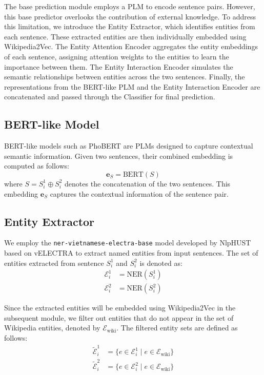 \documentclass{llncs}
\begin{document}
The base prediction module employs a PLM to encode sentence pairs. However, this base predictor overlooks the contribution of external knowledge. To address this limitation, we introduce the Entity Extractor, which identifies entities from each sentence. These extracted entities are then individually embedded using Wikipedia2Vec. The Entity Attention Encoder aggregates the entity embeddings of each sentence, assigning attention weights to the entities to learn the importance between them. The Entity Interaction Encoder simulates the semantic relationships between entities across the two sentences. Finally, the representations from the BERT-like PLM and the Entity Interaction Encoder are concatenated and passed through the Classifier for final prediction.

\subsection{BERT-like Model}

BERT-like models such as PhoBERT \parencite{nguyen2020phobert} are PLMs designed to capture contextual semantic information. Given two sentences, their combined embedding is computed as follows:
\begin{equation}
    \mathbf{e}_S = \mathrm{BERT}(S)
\end{equation}
where $S = S^1_i \oplus S^2_i$ denotes the concatenation of the two sentences. This embedding $\mathbf{e}_S$ captures the contextual information of the sentence pair.

\subsection{Entity Extractor}
We employ the \texttt{ner-vietnamese-electra-base} model developed by NlpHUST based on vELECTRA \parencite{the2020} to extract named entities from input sentences. The set of entities extracted from sentence $S^1_i$ and $S^2_i$ is denoted as:
\begin{align}
    \mathcal{E}^1_i &= \mathrm{NER}(S^1_i) \\
    \mathcal{E}^2_i &= \mathrm{NER}(S^2_i)
\end{align}

Since the extracted entities will be embedded using Wikipedia2Vec in the subsequent module, we filter out entities that do not appear in the set of Wikipedia entities, denoted by $\mathcal{E}_{\text{wiki}}$.  
The filtered entity sets are defined as follows:
\begin{align}
    \tilde{\mathcal{E}}^1_i &= \{ e \in \mathcal{E}^1_i \mid e \in \mathcal{E}_{\text{wiki}} \} \\
    \tilde{\mathcal{E}}^2_i &= \{ e \in \mathcal{E}^2_i \mid e \in \mathcal{E}_{\text{wiki}} \}
\end{align}
\end{document}
